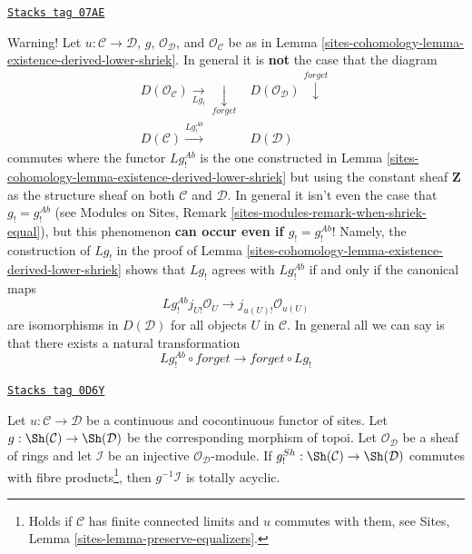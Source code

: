 \begin{remark}
\label{sites-cohomology-remark-when-derived-shriek-equal}
\href{https://stacks.math.columbia.edu/tag/07AE}{\texttt{Stacks tag 07AE}}

Warning! Let $u : \mathcal{C} \to \mathcal{D}$, $g$, $\mathcal{O}_\mathcal{D}$,
and $\mathcal{O}_\mathcal{C}$ be as in
Lemma \ref{sites-cohomology-lemma-existence-derived-lower-shriek}.
In general it is {\bf not} the case that the diagram
$$
\begin{array}{cc}D(\mathcal{O}_\mathcal{C}) \underset{Lg_!}{\longrightarrow}\underset{forget}{\downarrow} & D(\mathcal{O}_\mathcal{D}) \overset{forget}{\downarrow} \\ D(\mathcal{C}) \overset{Lg^{Ab}_!}{\longrightarrow} & D(\mathcal{D})\end{array}
$$
commutes where the functor $Lg_!^{Ab}$ is the one constructed in
Lemma \ref{sites-cohomology-lemma-existence-derived-lower-shriek}
but using the constant sheaf $\mathbf{Z}$ as the structure sheaf
on both $\mathcal{C}$ and $\mathcal{D}$. In general it isn't even
the case that $g_! = g_!^{Ab}$ (see
Modules on Sites, Remark \ref{sites-modules-remark-when-shriek-equal}),
but this phenomenon {\bf can occur even if $g_! = g_!^{Ab}$}! Namely,
the construction of $Lg_!$ in the proof of
Lemma \ref{sites-cohomology-lemma-existence-derived-lower-shriek}
shows that $Lg_!$ agrees with $Lg_!^{\textit{Ab}}$ if and only if
the canonical maps
$$
Lg^{Ab}_!j_{U!}\mathcal{O}_U \longrightarrow j_{u(U)!}\mathcal{O}_{u(U)}
$$
are isomorphisms in $D(\mathcal{D})$ for all objects $U$ in $\mathcal{C}$.
In general all we can say is that there exists a natural transformation
$$
Lg_!^{Ab} \circ forget \longrightarrow forget \circ Lg_!
$$
\end{remark}

\begin{lemma}
\label{sites-cohomology-lemma-pullback-injective-limp}
\href{https://stacks.math.columbia.edu/tag/0D6Y}{\texttt{Stacks tag 0D6Y}}

Let $u : \mathcal{C} \to \mathcal{D}$ be a continuous and cocontinuous
functor of sites. Let $g : \Sh(\mathcal{C}) \to \Sh(\mathcal{D})$
be the corresponding morphism of topoi. Let $\mathcal{O}_\mathcal{D}$
be a sheaf of rings and let $\mathcal{I}$ be an injective
$\mathcal{O}_\mathcal{D}$-module. If
$g_!^{Sh} : \Sh(\mathcal{C}) \to \Sh(\mathcal{D})$
commutes with fibre products\footnote{Holds if $\mathcal{C}$
has finite connected limits and $u$ commutes with them, see
Sites, Lemma \ref{sites-lemma-preserve-equalizers}.}, then
$g^{-1}\mathcal{I}$ is totally acyclic.
\end{lemma}


